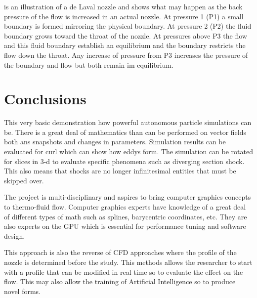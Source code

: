  is an illustration of a de Laval nozzle and shows what may happen as the back pressure of the flow is increased in an actual nozzle. At pressure 1 (P1) a small boundary is formed mirroring the physical boundary. At pressure 2 (P2) the fluid boundary grows toward the throat of the nozzle. At pressures above P3 the flow and this fluid boundary establish an equilibrium and the boundary restricts the flow down the throat. Any increase of pressure from P3 increases the pressure of the boundary and flow but both remain im equilibrium.


\section{Conclusions} \label{summary}

This very basic demonstration how powerful autonomous particle simulations can be. There is a great deal of mathematics than can be performed on vector fields both ans snapshots and changes in parameters. Simulation results can be evaluated for curl which can show how eddys form. The simulation can be rotated for slices in 3-d to evaluate specific phenomena such as diverging section shock. This also means that shocks are no longer infinitesimal entities that must be skipped over.

The project is multi-disciplinary and aspires to bring computer graphics concepts to thermo-fluid flow. Computer graphics experts have knowledge of a great deal of different types of math such as splines, barycentric coordinates, etc. They are also experts on the GPU which is essential for performance tuning and software design.

This approach is also the reverse of CFD approaches where the profile of the nozzle is determined before the study. This methods allows the researcher to start with a profile that can be modified in real time so to evaluate the effect on the flow. This may also allow the training of Artificial Intelligence so to produce novel forms.



 



